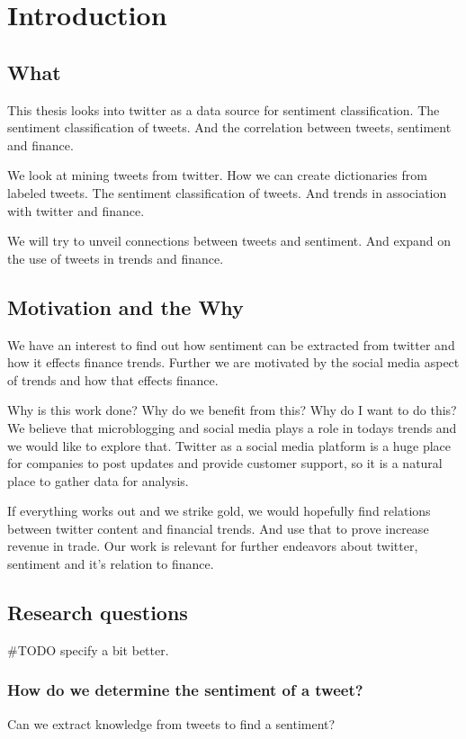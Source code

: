 \chapter{Introduction}\label{introduction}

\section{What}
This thesis looks into twitter as a data source for sentiment classification.
The sentiment classification of tweets. And the correlation between tweets,
sentiment and finance. 

We look at mining tweets from twitter. How we can create dictionaries from
labeled tweets. The sentiment classification of tweets. And trends in
association with twitter and finance. 

We will try to unveil connections between tweets and sentiment. And expand on
the use of tweets in trends and finance. 
%

\section{Motivation and the Why}
We have an interest to find out how sentiment can be extracted from twitter and
how it effects finance trends. Further we are motivated by the social media
aspect of trends and how that effects finance. 

Why is this work done? Why do we benefit from this? Why do I want to do this?
We believe that microblogging and social media plays a role in todays trends
and we would like to explore that. Twitter as a social media platform is a huge
place for companies to post updates and provide customer support, so it is a
natural place to gather data for analysis. 

If everything works out and we strike gold, we would hopefully find relations
between twitter content and financial trends. And use that to prove increase
revenue in trade. Our work is relevant for further endeavors about twitter,
sentiment and it's relation to finance. 

\section{Research questions}\label{introduction:research_questions}
#TODO specify a bit better. 

\subsection{How do we determine the sentiment of a
tweet?}\label{introduction:rq1}
Can we extract knowledge from tweets to find a sentiment?
	
